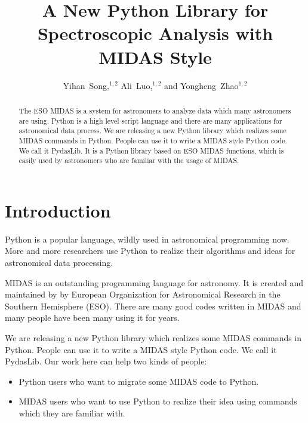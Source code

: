 
\resetcounters


\title{A New Python Library for Spectroscopic Analysis with MIDAS Style}
\author{Yihan~Song,$^{1,2}$ Ali~Luo,$^{1,2}$ and Yongheng~Zhao$^{1,2}$
}


\begin{abstract}
The ESO MIDAS is a system for astronomers to analyze data which many astronomers are using. Python is a high level script language and there are many applications for astronomical data process. We are releasing a new Python library which realizes some MIDAS commands in Python. People can use it to write a MIDAS style Python code. We call it PydasLib. It is a Python library based on ESO MIDAS functions, which is easily used by astronomers who are familiar with the usage of MIDAS.
\end{abstract}

	  \section{Introduction}
Python is a popular language, wildly used in astronomical programming now. More and more researchers use Python to realize their algorithms and ideas for astronomical data processing. 

MIDAS is an outstanding programming language for astronomy. It is created and maintained by by European Organization for Astronomical Research in the Southern Hemisphere (ESO). There are many good codes written in MIDAS and many people have been many using it for years.

We are releasing a new Python library which realizes some MIDAS commands in Python. People can use it to write a MIDAS style Python code. We call it PydasLib. Our work here can help two kinds of people:
\begin{itemize}
   \item Python users who want to migrate some MIDAS code to Python. 
   \item MIDAS users who want to use Python to realize their idea using commands which they are familiar with.
\end{itemize}


